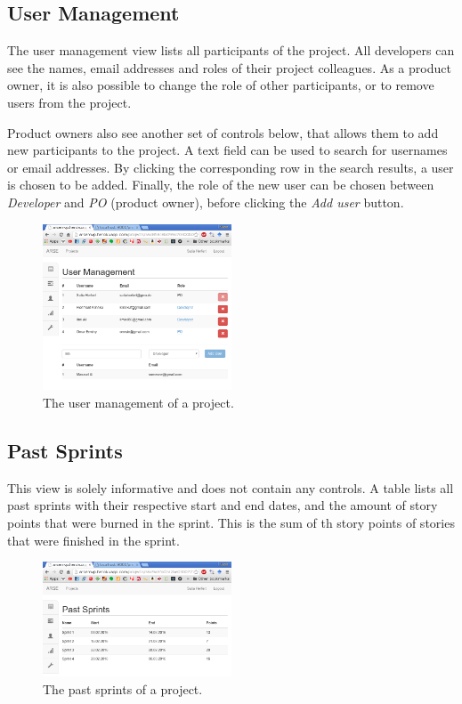 \documentclass[
	accentcolor=tud1a %
]{tudreport}
\begin{document}
\subsection{User Management}
\label{sec:user-mgmt}

The user management view lists all participants of the project. All developers can see the names, email addresses and roles of their project colleagues. As a product owner, it is also possible to change the role of other participants, or to remove users from the project.

Product owners also see another set of controls below, that allows them to add new participants to the project. A text field can be used to search for usernames or email addresses. By clicking the corresponding row in the search results, a user is chosen to be added. Finally, the role of the new user can be chosen between \emph{Developer} and \emph{PO} (product owner), before clicking the \emph{Add user} button.

\begin{figure}[ht]
	\centering
	\includegraphics[width=0.5\textwidth]{img/usermgmt}
	\caption{The user management of a project.}
	\label{fig:project-user-management}
\end{figure}

\subsection{Past Sprints}
\label{sec:past-spints}


This view is solely informative and does not contain any controls. A table lists all past sprints with their respective start and end dates, and the amount of story points that were burned in the sprint. This is the sum of th story points of stories that were finished in the sprint.

\begin{figure}[ht]
	\centering
	\includegraphics[width=0.5\textwidth]{img/pastsprints}
	\caption{The past sprints of a project.}
	\label{fig:project-past-sprints}
\end{figure}
\end{document}
